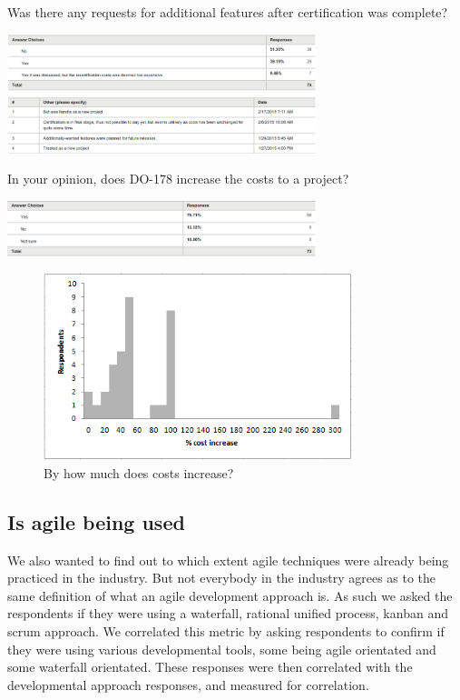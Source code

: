 \documentclass{sig-alternate-05-2015}
\begin{document}
\begin{table}[t!]
	\centering
	\caption{Was there any requests for additional features after certification was complete?}
	\includegraphics[width=90mm]{Was_there_any_requests_for_additional_features_after_certification_was_complete.png}
\end{table}

\begin{table}[t!]
	\centering
	\caption{In your opinion, does DO-178 increase the costs to a project?}
	\includegraphics[width=90mm]{Does_increase_costs.png}
\end{table}

\begin{figure}[t!]
	\centering 
	\includegraphics[width=90mm]{Cost_histogram.png}
	\caption{By how much does costs increase?}
\end{figure}

\subsection{Is agile being used}
We also wanted to find out to which extent agile techniques were already being practiced in the industry. But not everybody in the industry agrees as to the same definition of what an agile development approach is. As such we asked the respondents if they were using a waterfall, rational unified process, kanban and scrum approach. We correlated this metric by asking respondents to confirm if they were using various developmental tools, some being agile orientated and some waterfall orientated. These responses were then correlated with the developmental approach responses, and measured for correlation. 
\end{document}
